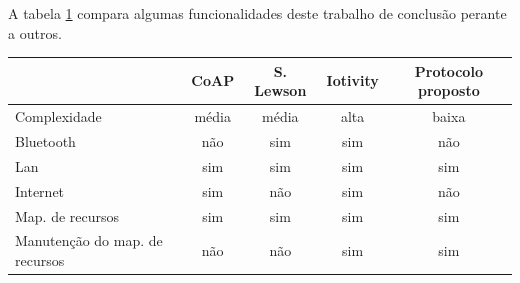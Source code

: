 A tabela \ref{table:tab1} compara algumas funcionalidades deste trabalho de conclusão perante a outros.

\begin{table}[htb!]
    \begin{tabular}{|l|c|c|c|c|}
    \hline
                                   & CoAP  & S. Lewson & Iotivity & Protocolo proposto \\ \hline
    Complexidade                   & média & média     & alta     & baixa              \\ \hline
    Bluetooth                      & não   & sim       & sim      & não                \\ \hline
    Lan                            & sim   & sim       & sim      & sim                \\ \hline
    Internet                       & sim   & não       & sim      & não                \\ \hline
    Map. de recursos               & sim   & sim       & sim      & sim                \\ \hline
    Manutenção do map. de recursos & não   & não       & sim      & sim                \\ \hline
    \end{tabular}
    \label{table:tab1}
\end{table}




